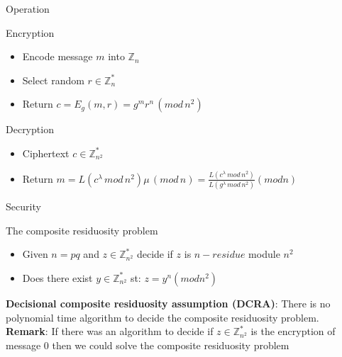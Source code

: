 \documentclass{beamer}
\begin{document}
\begin{frame}{Operation}
\begin{block}{Encryption}
\begin{itemize}
\item Encode message $m$ into $\mathbb{Z}_n$
\item Select random $r \in \mathbb{Z}^*_n$
\item Return $c = E_{g}(m,r) = g^m  r^n \, ( mod \, n^2 )$
\end{itemize}
\end{block}

\begin{block}{Decryption}
\begin{itemize}
\item Ciphertext $c \in \mathbb{Z}^*_{n^2}$
\item Return $m = L(c^\lambda \, mod \, n^2)  \mu \, ( mod \, n) = \frac{L(c^\lambda \, mod \, n^2)}{L(g^\lambda \, mod \, n^2)} (mod n) $
\end{itemize}
\end{block}

\end{frame}

\begin{frame}{Security}

\begin{block}{The composite residuosity problem}
\begin{itemize}
\item Given $n=p  q$ and $z \in \mathbb{Z}^*_{n^2}$ decide if $z$ is $n-residue$ module $n^2$
\item Does there exist $y \in \mathbb{Z}^*_{n^2}$ st: $z = y^n (mod n^2)$
\end{itemize}
\end{block}

\textbf{Decisional composite residuosity assumption (DCRA)}: There is no polynomial time algorithm to decide the composite residuosity problem. \\

\textbf{Remark}: If there was an algorithm to decide if $z \in \mathbb{Z}^*_{n^2}$ is the encryption of message $0$ then we could solve the composite residuosity problem

\end{frame}
\end{document}
